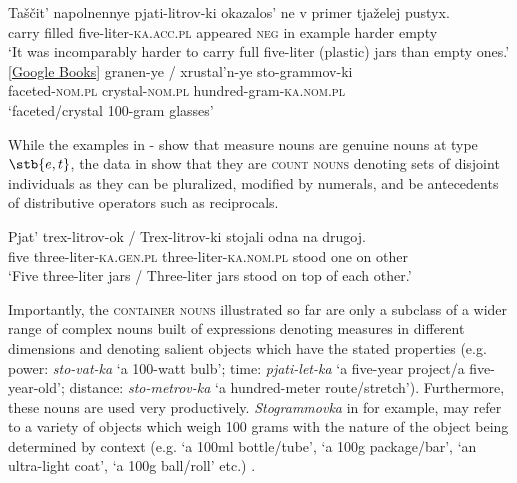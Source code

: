 \documentclass[output=paper,
colorlinks,
citecolor=brown,
newtxmath
]{langscibook}
\begin{document}
\ea\label{ex:khrizmann:3}
    \ea\label{ex:khrizmann:3a} \gll Taščit’ napolnennye pjati-litrov-ki okazalos’ ne v primer tjaželej pustyx.\\
    carry filled five-liter-\textsc{ka}.\textsc{acc.pl} appeared \textsc{neg} in example harder empty\\
    \glt `It was incomparably harder to carry full five-liter (plastic) jars than empty ones.' \hfill [\href{https://books.google.co.il/books?id=MeKhAAAAQBAJ&pg=PT111&lpg=PT111&dq=тащит+наполненные+пятилитровки&source}{Google Books}]
    \ex\label{ex:khrizmann:3b} \gll granen-ye {/} xrustal’n-ye sto-grammov-ki\\
    faceted-\textsc{nom.pl} {} crystal-\textsc{nom.pl} hundred-gram-\textsc{ka}.\textsc{nom.pl} \\
    \glt `faceted/crystal 100-gram glasses'
\z\z

\z

\noindent While the examples in - show that measure nouns are genuine nouns at type $\stb{e,t}$, the data in  show that they are \textsc{count nouns} denoting sets of disjoint individuals as they can be pluralized, modified by numerals, and be antecedents of distributive operators such as reciprocals.

\ea\label{ex:khrizmann:5} \gll Pjat’ trex-litrov-ok / Trex-litrov-ki stojali odna na drugoj.\\
five three-liter-\textsc{ka.gen.pl} {} three-liter-\textsc{ka.nom.pl} stood one on other\\
\glt `Five three-liter jars / Three-liter jars stood on top of each other.'
\z

\noindent Importantly, the \textsc{container nouns} illustrated so far are only a subclass of a wider range of complex nouns built of expressions denoting measures in different dimensions and denoting salient objects which have the stated properties (e.g. power: \textit{sto-vat-ka} `a 100-watt bulb'; time: \textit{pjati-let-ka} `a five-year project/a five-year-old'; distance: \textit{sto-metrov-ka} `a hundred-meter route/stretch'). Furthermore, these nouns are used very productively. \textit{Stogrammovka} in  for example, may refer to a variety of objects which weigh 100 grams with the nature of the object being determined by context (e.g. `a 100ml bottle/tube', `a 100g package/bar', `an ultra-light coat', `a 100g ball/roll' etc.) .
\end{document}
